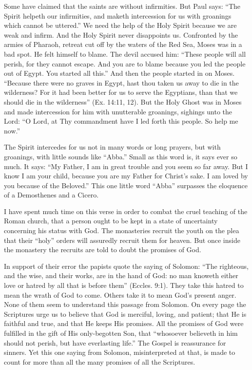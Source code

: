Some have claimed that the saints are without infirmities. But Paul says: “The Spirit helpeth our infirmities, and maketh intercession for us with groanings which cannot be uttered.” We need the help of the Holy Spirit because we are weak and infirm. And the Holy Spirit never disappoints us. Confronted by the armies of Pharaoh, retreat cut off by the waters of the Red Sea, Moses was in a bad spot. He felt himself to blame. The devil accused him: “These people will all perish, for they cannot escape. And you are to blame because you led the people out of Egypt. You started all this.” And then the people started in on Moses. “Because there were no graves in Egypt, hast thou taken us away to die in the wilderness? For it had been better for us to serve the Egyptians, than that we should die in the wilderness” (Ex. 14:11, 12). But the Holy Ghost was in Moses and made intercession for him with unutterable groanings, sighings unto the Lord: “O Lord, at Thy commandment have I led forth this people. So help me now.”

The Spirit intercedes for us not in many words or long prayers, but with groanings, with little sounds like “Abba.” Small as this word is, it says ever so much. It says: “My Father, I am in great trouble and you seem so far away. But I know I am your child, because you are my Father for Christ’s sake. I am loved by you because of the Beloved.” This one little word “Abba” surpasses the eloquence of a Demosthenes and a Cicero.

I have spent much time on this verse in order to combat the cruel teaching of the Roman church, that a person ought to be kept in a state of uncertainty concerning his status with God. The monasteries recruit the youth on the plea that their “holy” orders will assuredly recruit them for heaven. But once inside the monastery the recruits are told to doubt the promises of God.

In support of their error the papists quote the saying of Solomon: “The righteous, and the wise, and their works, are in the hand of God: no man knoweth either love or hatred by all that is before them” (Eccles. 9:1). They take this hatred to mean the wrath of God to come. Others take it to mean God’s present anger. None of them seem to understand this passage from Solomon. On every page the Scriptures urge us to believe that God is merciful, loving, and patient; that He is faithful and true, and that He keeps His promises. All the promises of God were fulfilled in the gift of His only-begotten Son, that “whosoever believeth in him should not perish, but have everlasting life.” The Gospel is reassurance for sinners. Yet this one saying from Solomon, misinterpreted at that, is made to count for more than all the many promises of all the Scriptures.

